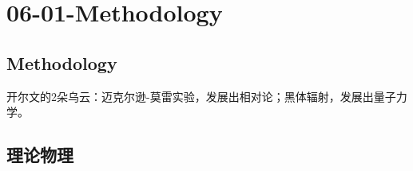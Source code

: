 






\chapter{06-01-Methodology}


\section{Methodology}


开尔文的2朵乌云：迈克尔逊-莫雷实验，发展出相对论；黑体辐射，发展出量子力学。

\section{理论物理}%

